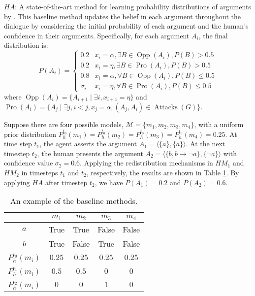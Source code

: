 \item \textit{$H\!A$}: A state-of-the-art method for learning probability distributions of arguments by \citet{hunter2016persuasion}. 
This baseline method updates the belief in each argument throughout the dialogue by considering the initial probability of each argument and the human's confidence in their arguments. 
Specifically, for each argument $A_i$, the final distribution is:
\begin{equation}
      P(A_i)\!\!= \begin{cases}
      0.2 & x_i = \alpha, \exists B \in \operatorname{Opp}(A_i), P(B)>0.5 \\ 
      0.2 & x_i = \eta, \exists B \in \operatorname{Pro}(A_i), P(B)>0.5 \\ 
      0.8 & x_i = \alpha, \forall B \in \operatorname{Opp}(A_i), P(B) \leq 0.5 \\ 
      \sigma_i & x_i = \eta, \forall B \in \operatorname{Pro}(A_i), P(B) \leq 0.5
      \end{cases}
      \end{equation}
where $\operatorname{Opp}(A_i)= \{A_{i+1} \mid \exists i, x_{i+1} = \eta\}$ and $\operatorname{Pro}(A_i) = \{A_j \mid \exists j, i<j, x_j = \alpha, (A_j, A_i) \in  \operatorname{Attacks}(G)\}$.
\squishend

\begin{example}
Suppose there are four possible models, $\mathcal{M} = \{m_1, m_2, m_3, m_4\}$, with a uniform prior distribution $P^{t_0}_h(m_1) = P^{t_0}_h(m_2) = P^{t_0}_h(m_3) = P^{t_0}_h(m_4) = 0.25$. At time step $t_1$, the agent asserts the argument $A_1 = \langle \{a\}, \{a\} \rangle$. At the next timestep $t_2$, the human presents the argument $A_2 =  \langle \{b, b \rightarrow \neg a\}, \{\neg a\} \rangle$ with confidence value $\sigma_2 = 0.6$. Applying the redistribution mechanisms in $H\!M_1$ and $H\!M_2$ in timesteps $t_1$ and $t_2$, respectively, the results are shown in Table \ref{table:example_of_hunter}. By applying $H\!A$ after timestep $t_2$, we have $P(A_1) = 0.2$ and $P(A_2) = 0.6$.
\begin{table}[t]
\centering \small
\begin{tabular}{ccccc}
\toprule[2pt]
& $m_1$ & $m_2$ & $m_3$ & $m_4$ \\ \midrule[2pt]
$a$                 & True  & True  & False & False \\ [1ex]
$b$                 & True  & False & True  & False \\ [1ex]
$P^{t_0}_{h}(m_i)$    & $0.25$   & $0.25$   & $0.25$   & $0.25$  \\ [1ex]
$P^{t_1}_{h}(m_i)$      & $0.5$   & $0.5$   &  $0$    &  $0$     \\
$P^{t_2}_{h}(m_i)$      & $0$   & $0$   &  $1$    &  $0$     \\
\bottomrule[2pt]
\end{tabular}
\caption{An example of the baseline methods.}
\label{table:example_of_hunter}
\end{table}
\end{example}

